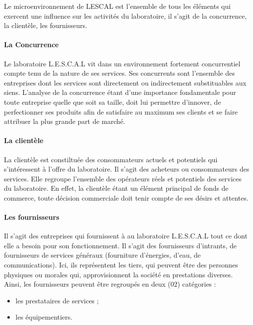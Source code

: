 Le microenvironnement de LESCAL est l'ensemble de tous les éléments qui
exercent une influence sur les activités du laboratoire, il s'agit de la
concurrence, la clientèle, les fournisseurs.

\paragraph{La Concurrence}\label{la-concurrence}

Le laboratoire L.E.S.C.A.L vit dans un environnement fortement
concurrentiel compte tenu de la nature de ses services. Ses concurrents
sont l'ensemble des entreprises dont les services sont directement ou
indirectement substituables aux siens. L'analyse de la concurrence étant
d'une importance fondamentale pour toute entreprise quelle que soit sa
taille, doit lui permettre d'innover, de perfectionner ses produits afin
de satisfaire au maximum ses clients et se faire attribuer la plus
grande part de marché.

\paragraph{La clientèle}\label{la-clientuxe8le}

La clientèle est constiltuée des consommateurs actuels et potentiels qui
s'intéressent à l'offre du laboratoire. Il s'agit des acheteurs ou
consommateurs des services. Elle regroupe l'ensemble des opérateurs
réels et potentiels des services du laboratoire. En effet, la clientèle
étant un élément principal de fonds de commerce, toute décision
commerciale doit tenir compte de ses désirs et attentes.

\paragraph{Les fournisseurs}\label{les-fournisseurs}

Il s'agit des entreprises qui fournissent à au laboratoire L.E.S.C.A.L
tout ce dont elle a besoin pour son fonctionnement. Il s'agit des
fournisseurs d'intrants, de fournisseurs de services généraux
(fourniture d'énergies, d'eau, de communications). Ici, ils représentent
les tiers, qui peuvent être des personnes physiques ou morales qui,
approvisionnent la société en prestations diverses. Ainsi, les
fournisseurs peuvent être regroupés en deux (02) catégories :

\begin{itemize}
\item
  les prestataires de services ;
\item
  les équipementiers.
\end{itemize}

